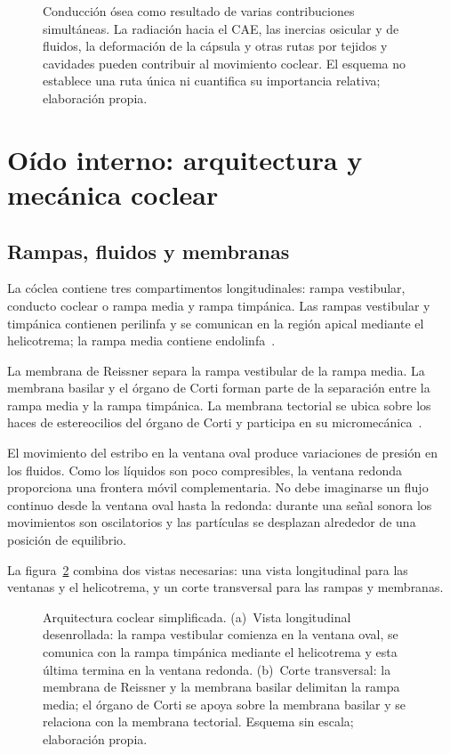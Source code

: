\begin{figure}[htbp]
    \centering
    
    \caption{Conducción ósea como resultado de varias contribuciones
    simultáneas. La radiación hacia el CAE, las inercias osicular y de fluidos,
    la deformación de la cápsula y otras rutas por tejidos y cavidades pueden
    contribuir al movimiento coclear. El esquema no establece una ruta única
    ni cuantifica su importancia relativa; elaboración propia.}
    \label{fig:u6-conduccion-osea}
\end{figure}

\section{Oído interno: arquitectura y mecánica coclear}
\label{sec:u6-oido-interno}

\subsection{Rampas, fluidos y membranas}
\label{sec:u6-rampas-fluidos}

La cóclea contiene tres compartimentos longitudinales: rampa
vestibular, conducto coclear o rampa media y rampa timpánica. Las rampas
vestibular y timpánica contienen perilinfa y se comunican en la región apical
mediante el helicotrema; la rampa media contiene endolinfa~\cite{fettiplace2017}.

La membrana de Reissner separa la rampa vestibular de la rampa media.
La membrana basilar y el órgano de Corti forman parte de la separación entre
la rampa media y la rampa timpánica. La membrana tectorial se ubica sobre los
haces de estereocilios del órgano de Corti y participa en su micromecánica~\cite{fettiplace2017}.

El movimiento del estribo en la ventana oval produce variaciones de presión
en los fluidos. Como los líquidos son poco compresibles, la ventana redonda
proporciona una frontera móvil complementaria. No debe imaginarse un flujo
continuo desde la ventana oval hasta la redonda: durante una señal sonora los
movimientos son oscilatorios y las partículas se desplazan alrededor de una
posición de equilibrio.

La figura~\ref{fig:u6-arquitectura-coclear} combina dos vistas necesarias:
una vista longitudinal para las ventanas y el helicotrema, y un corte
transversal para las rampas y membranas.

\begin{figure}[htbp]
    \centering
    
    \caption{Arquitectura coclear simplificada. (a)~Vista longitudinal
    desenrollada: la rampa vestibular comienza en la ventana oval, se comunica
    con la rampa timpánica mediante el helicotrema y esta última termina en la
    ventana redonda. (b)~Corte transversal: la membrana de Reissner y la
    membrana basilar delimitan la rampa media; el órgano de Corti se apoya
    sobre la membrana basilar y se relaciona con la membrana tectorial. Esquema
    sin escala; elaboración propia.}
    \label{fig:u6-arquitectura-coclear}
\end{figure}

